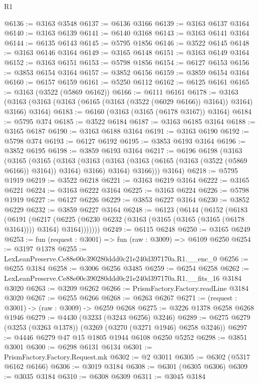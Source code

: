 \begin{lexlean}{R1}
\begin{coremodule}
@6136 := @3163 @3548
@6137 := @6136 @3166
@6139 := @3163 @6137 @3164
@6140 := @3163 @6139
@6141 := @6140 @3168
@6143 := @3163 @6141 @3164
@6144 := @6135 @6143
@6145 := @5795 @1856
@6146 := @3522 @6145
@6148 := @3163 @6146 @3164
@6149 := @3165 @6148
@6151 := @3163 @6149 @3164
@6152 := @3163 @6151
@6153 := @5798 @1856
@6154 := @6127 @6153
@6156 := @3853 @6154 @3164
@6157 := @3852 @6156
@6159 := @3859 @6154 @3164
@6160 := @6157 @6159
@6161 := @5250 @6112
@6162 := @6125 @6161
@6165 := @3163 (@3522 (@5869 @6162))
@6166 := @6111 @6161
@6178 := @3163 (@3163 (@3163 (@3163 (@6165 (@3163 (@3522 (@6029 @6166)) @3164)) @3164) @3166) @3164)
@6183 := @6160 (@3163 (@3165 (@6178 @3167)) @3164)
@6184 := @5795 @374
@6185 := @3522 @6184
@6187 := @3163 @6185 @3164
@6188 := @3165 @6187
@6190 := @3163 @6188 @3164
@6191 := @3163 @6190
@6192 := @5798 @374
@6193 := @6127 @6192
@6195 := @3853 @6193 @3164
@6196 := @3852 @6195
@6198 := @3859 @6193 @3164
@6217 := @6196
    @6198
    (@3163
      (@3165
        (@3165
          (@3163
            (@3163 (@3163 (@3163 (@6165 (@3163 (@3522 (@5869 @6166)) @3164)) @3164) @3166) @3164)
            @3166)))
      @3164)
@6218 := @5795 @1919
@6219 := @3522 @6218
@6221 := @3163 @6219 @3164
@6222 := @3165 @6221
@6224 := @3163 @6222 @3164
@6225 := @3163 @6224
@6226 := @5798 @1919
@6227 := @6127 @6226
@6229 := @3853 @6227 @3164
@6230 := @3852 @6229
@6232 := @3859 @6227 @3164
@6248 := @6123
    (@6144
      (@6152
        (@6183
          (@6191
            (@6217
              (@6225 (@6230 @6232 (@3163 (@3165 (@3165 (@3165 (@6178 @3164)))) @3164) @3164)))))))
@6249 := @6115 @6248
@6250 := @3165 @6249
@6253 := fun (request : @3001) => fun (raw : @3009) => @6109 @6250
@6254 := @3197 @1378
@6255 := LexLeanPreserve.Ce88e00c390280ddd0c21e240d397170a.R1.__enc_0
@6256 := @6255 @3184
@6258 := @3006 @6256 @3485
@6259 := @6254 @6258
@6262 := LexLeanPreserve.Ce88e00c390280ddd0c21e240d397170a.R1.__fits_16 @3184 @3020
@6263 := @3209 @6262
@6266 := PrismFactory.Factory.readLine @3184 @3020
@6267 := @6255 @6266
@6268 := @6263 @6267
@6271 := (request : @3001) -> (raw : @3009) -> @6259 @6268
@6275 := @3226 @1378 @6258 @6268 @1946
@6279 := @4430 (@3233 (@3243 @6256) @3246)
@6289 := @6275 @6279 (@3253 (@3263 @1378)) (@3269 (@3270 (@3271 @1946) @6258 @3246))
@6297 := @4446 @6279 @47 @15 @1805 @1944 @6108 @6250 @5252
@6298 := @3851 @3001
@6300 := @6298 @6131 @6134
@6301 := PrismFactory.Factory.Request.mk
@6302 := @2 @3011
@6305 := @6302 (@5317 @6162 @6166)
@6306 := @3019 @3184
@6308 := @6301 (@6305 @6306)
@6309 := @3035 @3184
@6310 := @6308 @6309
@6311 := @3045 @3184

\end{coremodule}
\end{lexlean}

